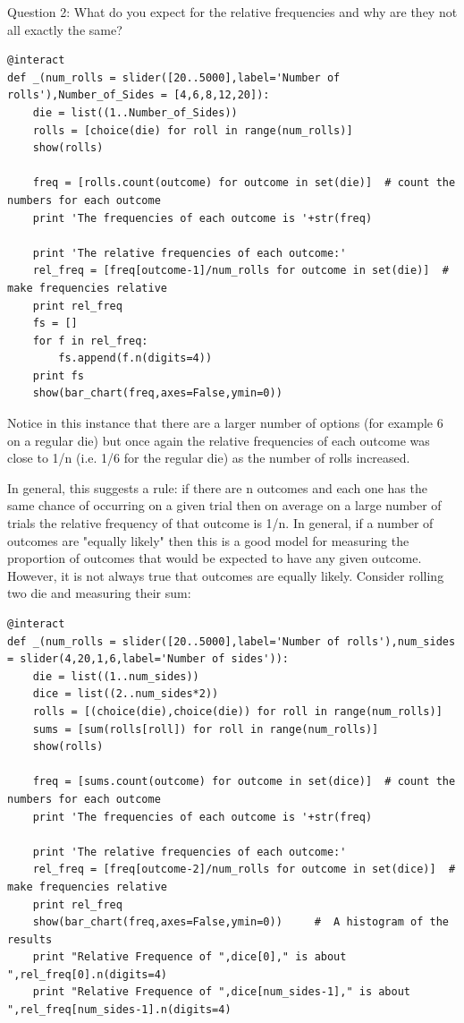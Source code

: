 \documentclass[10pt,]{book}
\theoremstyle{plain}
\theoremstyle{definition}
\theoremstyle{definition}
\theoremstyle{definition}
\numberwithin{equation}{section}
\begin{document}
	Question 2: What do you expect for the relative frequencies and why are they not all exactly the same?
\begin{lstlisting}[style=sageinput]
@interact
def _(num_rolls = slider([20..5000],label='Number of rolls'),Number_of_Sides = [4,6,8,12,20]):
	die = list((1..Number_of_Sides))
	rolls = [choice(die) for roll in range(num_rolls)]
	show(rolls)   

	freq = [rolls.count(outcome) for outcome in set(die)]  # count the numbers for each outcome
	print 'The frequencies of each outcome is '+str(freq)

	print 'The relative frequencies of each outcome:'
	rel_freq = [freq[outcome-1]/num_rolls for outcome in set(die)]  # make frequencies relative
	print rel_freq
	fs = []
	for f in rel_freq:
		fs.append(f.n(digits=4))
	print fs
	show(bar_chart(freq,axes=False,ymin=0))
\end{lstlisting}
\par
Notice in this instance that there are a larger number of options (for example 6 on a regular
	die) but once again the relative frequencies of each  outcome was close to 1/n (i.e. 1/6 for the regular die)
	as the number of rolls increased.%
\par
In general, this suggests a rule: if there are n outcomes and each one has the same
	chance of occurring on a given trial then on average on a large number of trials the relative
	frequency of that outcome is 1/n.
	In general, if a number of outcomes are "equally likely" then this is a good model for measuring
	the proportion of outcomes that would be expected to have any given outcome. However, it is not
	always true that outcomes are equally likely. Consider rolling two die and measuring their sum:%
\begin{lstlisting}[style=sageinput]
@interact
def _(num_rolls = slider([20..5000],label='Number of rolls'),num_sides = slider(4,20,1,6,label='Number of sides')):
    die = list((1..num_sides))
    dice = list((2..num_sides*2))
    rolls = [(choice(die),choice(die)) for roll in range(num_rolls)]
    sums = [sum(rolls[roll]) for roll in range(num_rolls)]
    show(rolls)   

    freq = [sums.count(outcome) for outcome in set(dice)]  # count the numbers for each outcome
    print 'The frequencies of each outcome is '+str(freq)
    
    print 'The relative frequencies of each outcome:'
    rel_freq = [freq[outcome-2]/num_rolls for outcome in set(dice)]  # make frequencies relative
    print rel_freq        
    show(bar_chart(freq,axes=False,ymin=0))     #  A histogram of the results
    print "Relative Frequence of ",dice[0]," is about ",rel_freq[0].n(digits=4)
    print "Relative Frequence of ",dice[num_sides-1]," is about ",rel_freq[num_sides-1].n(digits=4)
\end{lstlisting}
\end{document}
